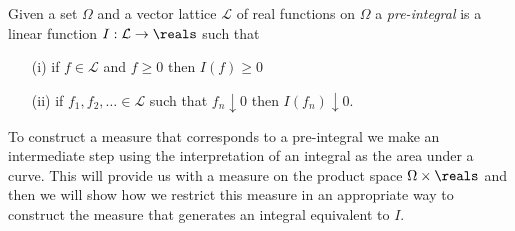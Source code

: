 \begin{defn}Given a set $\Omega$ and a vector lattice $\mathcal{L}$ of
  real functions on $\Omega$ a \emph{pre-integral} is a linear
  function $I : \mathcal{L} \to \reals$ such that 
\begin{itemize}
\item[(i)]if $f \in \mathcal{L}$ and $f \geq 0$ then $I(f) \geq 0$
\item[(ii)]if $f_1, f_2, \dots \in \mathcal{L}$ such that $f_n
  \downarrow 0$ then $I(f_n) \downarrow 0$.
\end{itemize}
\end{defn}

To construct a measure that corresponds to a pre-integral we make an
intermediate step using the interpretation of an integral as the area
under a curve.  This will provide us with a measure on the product
space $\Omega \times \reals$ and then we will show how we restrict
this measure in an appropriate way to construct the measure that
generates an integral equivalent to $I$.

